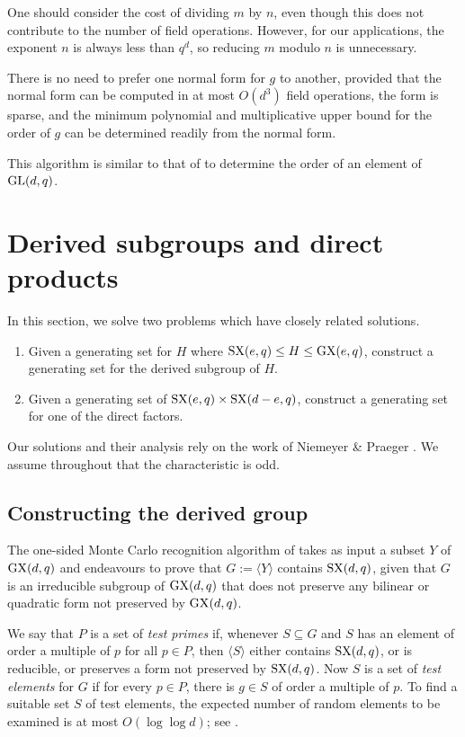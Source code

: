 \documentclass[12pt]{article}
\def\GL{{\rm GL}}
\def\SX{{\rm SX}}
\def\GX{{\rm GX}}
\begin{document}
One should consider the cost of
dividing $m$ by $n$, even though this does not 
contribute to the number of field operations. 
However, for our applications, the exponent $n$ 
is always less than $q^d$, so
reducing $m$ modulo $n$ is unnecessary.

There is no need to prefer one normal form for $g$ to another,
provided that the normal form can be computed in at most $O(d^3)$ field
operations, the form is sparse, and the minimum polynomial
and multiplicative upper bound for the order of $g$
can be determined readily from the normal form.

This algorithm is similar to 
that of \cite{CLG97} to determine 
the order of an element of $\GL(d, q)$.

\section{Derived subgroups and direct products} 
\label{Pow}
In this section, we solve two problems which have
closely related solutions. 
\begin{enumerate}
\item 
Given a generating set for $H$ where $\SX(e,q)\le H\le \GX(e,q)$,
construct a generating set for the derived subgroup of $H$.
\item 
Given a generating set of $\SX(e,q)\times\SX(d-e,q)$,
construct a generating set for one of the direct factors.
\end{enumerate}
Our solutions and their analysis rely on the work
of Niemeyer \& Praeger \cite{NP,JAMS}.
We assume throughout that the characteristic is odd.

\subsection{Constructing the derived group}
The one-sided Monte Carlo recognition algorithm of \cite{NP} 
takes as input a subset $Y$ of $\GX(d,q)$ and 
endeavours to prove that $G:=\langle Y\rangle$ contains $\SX(d,q)$, given that
$G$ is an irreducible subgroup of $\GX(d,q)$ that does not
preserve any bilinear or quadratic form not preserved by $\GX(d,q)$.

We say that $P$ is a set of {\it test primes} if, whenever $S \subseteq G$
and $S$ has an element of order a multiple of $p$ for all $p \in P$, 
then $\langle S \rangle$ either contains $\SX(d,q)$, or is reducible, 
or preserves a form not preserved by $\SX(d,q)$.  
Now $S$ is a set of {\it test elements} for $G$ if 
for every $p \in P$, there is $g \in S$ of order a multiple of $p$.
To find a suitable set $S$ of test elements, the expected 
number of random elements to be examined is at most 
$O(\log\log d)$; see \cite[Proposition 7.5]{NP}.
\end{document}
